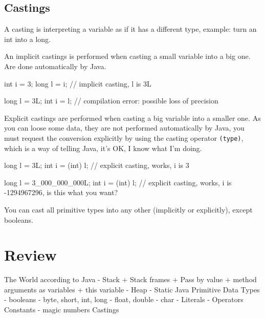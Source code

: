 \documentclass[8pt, a4paper, oneside]{extarticle}
\begin{document}
\begin{multicols}{2}
\columnbreak
{}
\end{multicols}

\subsection{Castings}

A casting is interpreting a variable as if it has a different type, example:
turn an int into a long.

An implicit castings is performed when casting a small variable into a big one.
Are done automatically by Java.

\begin{blackboard}
int i = 3;
long l = i; // implicit casting, l is 3L

long l = 3L;
int i = l; // compilation error: possible loss of precision
\end{blackboard}

Explicit castings are performed when casting a big variable into a smaller one.
As you can loose some data, they are not performed automatically by Java, you
must request the conversion explicitly by using the casting operator
\verb+(type)+, which is a way of telling Java, it's OK, I know what I'm doing.

\begin{blackboard}
long l = 3L;
int i = (int) l; // explicit casting, works, i is 3

long l = 3_000_000_000L;
int i = (int) l; // explicit casting, works, i is -1294967296, is this what you want?
\end{blackboard}

You can cast all primitive types into any other (implicitly or explicitly),
except booleans.

\section{Review}

\begin{blackboard}
The World according to Java
  - Stack
    + Stack frames
    + Pass by value
    + method arguments as variables
    + this variable
  - Heap
  - Static
Java Primitive Data Types
  - booleans
  - byte, short, int, long
  - float, double
  - char
  - Literals
  - Operators
Constants
  - magic numbers
Castings
\end{blackboard}
\end{document}
